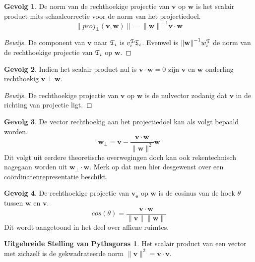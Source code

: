 \documentclass{amsart}
\theoremstyle{definition}
\newtheorem{csq}{Gevolg}[section]
\newenvironment{bewijs}{\begin{proof}[Bewijs]}{\end{proof}}
\newcommand{\norm}[1]{\lVert{#1}\rVert}
\newcommand{\vvec}[1][v]{\mathbf{#1}}
\newcommand{\uvec}[1][v]{\vvec[#1]_\mathbf{e}}
\newcommand{\vnorm}[1]{\norm{\vvec[#1]}}
\newcommand{\vecrow}[1][a]{\mathfrak{\MakeUppercase{#1}}}
\newcommand{\rvec}[2][i]{{#2}_{#1}}
\newcommand{\rvecr}[2][i]{\rvec[#1]{\vecrow[#2]}}
\newcommand{\vcord}[3]{{#1}_{#2}^{#3}}
\newcommand{\vcordv}[3][v]{\vcord{#1}{#2}{\vecrow[#3]}}
\newcommand{\vcordvi}[2][i]{\vcordv{#1}{#2}}
\begin{document}
\begin{csq}
	De norm van de rechthoekige projectie van $\vvec$ op $\vvec[w]$ is het scalair product mits schaalcorrectie voor de norm van het projectiedoel.
	\begin{equation*}
		\norm{proj_\perp(\vvec, \vvec[w])} = {\vnorm w}^{-1}\vvec \cdot \vvec[w]
	\end{equation*}
	\begin{bewijs}
		De component van $\vvec$ naar $\rvecr{t}$ is $\vcordvi{t}\rvecr{t}$. Evenwel is ${\vnorm w}^{-1}\vcordv[w]{i}{t}$ de norm van de rechthoekige projectie van $\rvecr{t}$ op $\vvec[w]$.
	\end{bewijs}
\end{csq}

\begin{csq}
	Indien het scalair product nul is $\vvec \cdot\vvec[w] = 0$ zijn $\vvec$ en $\vvec[w]$ onderling rechthoekig $\vvec\perp\vvec[w]$.
	\begin{bewijs}
		De rechthoekige projectie van $\vvec$ op $\vvec[w]$ is de nulvector zodanig dat $\vvec$ in de richting van projectie ligt.
	\end{bewijs}
\end{csq}

\begin{csq}
	De vector rechthoekig aan het projectiedoel kan als volgt bepaald worden.
	\begin{equation*}
		\vvec[w]_\perp = \vvec - \frac{\vvec\cdot\vvec[w]}{\vnorm w^2}\vvec[w]
	\end{equation*}
	Dit volgt uit eerdere theoretische overwegingen doch kan ook rekentechnisch nagegaan worden uit $\vvec[w]_\perp\cdot\vvec[w]$.
	Merk op dat men hier desgewenst over een coördinatenrepresentatie beschikt.
\end{csq}

\begin{csq}
	De rechthoekige projectie van $\uvec$ op $\vvec[w]$ is de cosinus van de hoek $\theta$ tussen $\vvec[w]$ en $\vvec$.
	\begin{equation*}
		cos(\theta) = \frac{\vvec \cdot \vvec[w]}{\vnorm v\vnorm w}
	\end{equation*}
	Dit wordt aangetoond in het deel over affiene ruimtes.
\end{csq}

\newtheorem*{pyth}{Uitgebreide Stelling van Pythagoras}
\begin{pyth}
	Het scalair product van een vector met zichzelf is de gekwadrateerde norm $\vnorm v^2 = \vvec\cdot\vvec$.
\end{pyth}
\end{document}

